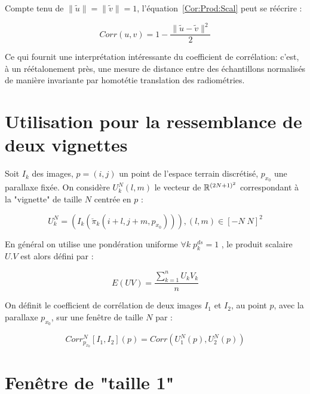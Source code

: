 Compte tenu de  $\|\tilde{u}\|=\|\tilde{v}\|=1 $,
l'\'equation~\ref{Cor:Prod:Scal}  peut se r\'e\'ecrire :


\begin{equation}
   Corr(u,v) =  1-\frac{\|\tilde{u}-\tilde{v}\|^2}{2}
\label{Corr:As:Norme}
\end{equation}

Ce qui fournit une interpr\'etation int\'eressante du coefficient
de corr\'elation: c'est, \`a un r\'e\'etalonement pr\`es, une mesure
de distance entre des \'echantillons normalis\'es de mani\`ere
 invariante par homot\'etie translation des radiom\'etries.


\section{Utilisation pour la ressemblance de  deux vignettes}

\label{Vign:Correl}

Soit $I_k$ des images, $p=(i,j)$ un point de l'espace terrain
discr\'etis\'e, $p_{x_0}$ une parallaxe fix\'ee.
On consid\`ere $U^N_k(l,m)$ le vecteur  de $\RR^{(2N+1)^2}$ correspondant  \`a  la
"vignette" de taille $N$ centr\'ee en $p$ :


\begin{equation}
   U^N_k = (I_k( \breve\pi_k(i+l,j+m,p_{x_0}))) ,  (l,m) \in [-N \; N] ^2
\end{equation}

En g\'en\'eral on  utilise une pond\'eration uniforme $\forall k \;p^{ds}_k=1$ ,
le produit scalaire $U.V$ est alors d\'efini par :

\begin{equation}
   E(UV) =  \frac{\sum^n_{k=1} U_k V_k}n
\end{equation}


On d\'efinit le coefficient de corr\'elation de deux images $I_1$ et $I_2$,
au point $p$, avec la parallaxe $p_{x_0}$, sur une fen\^etre de taille $N$ par :


\begin{equation}
   Corr^N_{p_{x_0}}[I_1,I_2](p) =   Corr(U^N_1(p),U^N_2(p))
\end{equation}


\section{Fen\^etre de "taille 1"}


